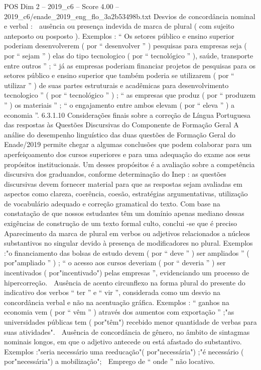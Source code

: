 \begin{textsample}{POS Dim 2 – 2019\_c6 – Score 4.00 – 2019\_c6/enade\_2019\_eng\_flo\_3a2b53498b.txt}
Desvios de concordância nominal e verbal :  ausência ou presença indevida de marca de plural ( com sujeito anteposto ou posposto ).
Exemplos : “ Os setores público e ensino superior poderiam desenvolverem ( por “ desenvolver ” ) pesquisas para empresas seja ( por “ sejam ” ) elas do tipo tecnologico ( por “ tecnológico ” ), saúde, transporte entre outros ” ; “ já as empresas poderiam financiar projetos de pesquisas para os setores público e ensino superior que também poderia se utilizarem ( por “ utilizar ” ) de suas partes estruturais e acadêmicas para desenvolvimento tecnologico ” ( por “ tecnológico ” ) ; “ as empresas que produz ( por “ produzem ” ) os materiais ” ; “ o engajamento entre ambos elevam ( por “ eleva ” ) a economia ”. 6.3.1.10 Considerações finais sobre a correção de Língua Portuguesa das respostas às Questões Discursivas do Componente de Formação Geral A análise do desempenho linguístico das duas questões de Formação Geral do Enade/2019 permite chegar a algumas conclusões que podem colaborar para um aperfeiçoamento dos cursos superiores e para uma adequação do exame aos seus propósitos institucionais.
Um desses propósitos é a avaliação sobre a competência discursiva dos graduandos, conforme determinação do Inep : as questões discursivas devem fornecer material para que as respostas sejam avaliadas em aspectos como clareza, coerência, coesão, estratégias argumentativas, utilização de vocabulário adequado e correção gramatical do texto.
Com base na constatação de que nossos estudantes têm um domínio apenas mediano dessas exigências de construção de um texto formal culto, conclui -se que é preciso  Aparecimento da marca de plural em verbos ou adjetivos relacionados a núcleos substantivos no singular devido à presença de modificadores no plural.
Exemplos :"o financiamento das bolsas de estudo devem ( por “ deve ” ) ser ampliados ” ( por"ampliado ” ) ; “ o acesso aos cursos deveriam ( por “ deveria ” ) ser incentivados ( por"incentivado") pelas empresas ”, evidenciando um processo de hipercorreção.  Ausência de acento circunflexo na forma plural do presente do indicativo dos verbos “ ter ” e “ vir ”, considerada como um desvio na concordância verbal e não na acentuação gráfica.
Exemplos : “ ganhos na economia vem ( por “ vêm ” ) através dos aumentos com exportação ” ;"as universidades públicas tem ( por"têm") recebido menor quantidade de verbas para suas atividades".  Ausência de concordância de gênero, no âmbito de sintagmas nominais longos, em que o adjetivo antecede ou está afastado do substantivo.
Exemplos :"seria necessário uma reeducação"( por"necessária") ;"é necessário ( por"necessária") a mobilização";  Emprego de “ onde ” não locativo.

\end{textsample}
